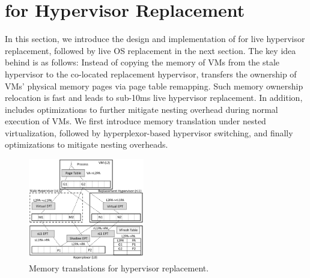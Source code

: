 \section{\arch for Hypervisor Replacement}
In this section, we introduce the design and implementation of \arch for 
live hypervisor replacement, followed by live OS replacement 
in the next section. 
The key idea behind \arch is as follows: Instead of copying the memory 
of VMs from the stale hypervisor to the co-located replacement hypervisor, 
\arch transfers the ownership of VMs' physical memory pages via page table remapping. 
Such memory ownership relocation is fast and leads to sub-10ms live hypervisor 
replacement. In addition, \arch includes optimizations to further mitigate 
nesting overhead during normal execution of VMs.
We first introduce memory translation under nested virtualization, 
followed by hyperplexor-based hypervisor switching, and finally 
optimizations to mitigate nesting overheads.



\begin{figure}[t!]
 	  \includegraphics[width=0.45\textwidth]{figures/vfresh-table.pdf}
  \caption{Memory translations for hypervisor replacement.}
  \label{fig:mapping}
\end{figure}

